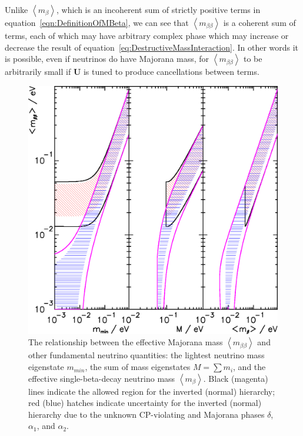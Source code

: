 Unlike $\left< m_\beta \right>$, which is an incoherent sum of strictly positive terms in equation~\ref{eqn:DefinitionOfMBeta}, we can see that $\left< m_{\beta\beta} \right>$ is a coherent sum of terms, each of which may have arbitrary complex phase which may increase or decrease the result of equation~\ref{eq:DestructiveMassInteraction}.  In other words it is possible, even if neutrinos do have Majorana mass, for $\left< m_{\beta\beta} \right>$ to be arbitrarily small if $\mathbf{U}$ is tuned to produce cancellations between terms.

\begin{figure}
\begin{center}
\includegraphics[keepaspectratio=true,width=\textwidth]{PDGNeutrinoMassBounds.eps}
\end{center}
\caption{The relationship between the effective Majorana mass $\left<m_{\beta\beta}\right>$ and other fundamental neutrino quantities: the lightest neutrino mass eigenstate $m_{min}$, the sum of mass eigenstates $M = \sum m_i$, and the effective single-beta-decay neutrino mass $\left<m_{\beta}\right>$.  Black (magenta) lines indicate the allowed region for the inverted (normal) hierarchy; red (blue) hatches indicate uncertainty for the inverted (normal) hierarchy due to the unknown CP-violating and Majorana phases $\delta$, $\alpha_1$, and $\alpha_2$.~\cite{PDG}}
\label{fig:NeutrinoMassBounds}
\end{figure}

